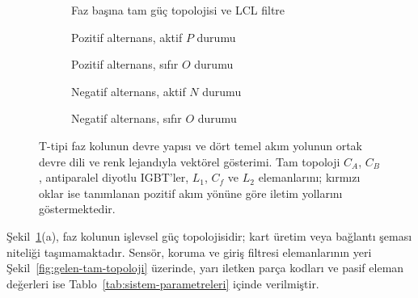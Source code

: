\begin{figure}[htbp]
  \centering
  \begin{subfigure}[t]{0.96\textwidth}
    \centering
    \resizebox{0.98\linewidth}{!}{\ttypefulltopology}
    \caption{Faz başına tam güç topolojisi ve LCL filtre}
  \end{subfigure}

  \vspace{4mm}
  \begin{subfigure}[t]{0.48\textwidth}
    \centering
    \caption{Pozitif alternans, aktif $P$ durumu}
  \end{subfigure}\hfill
  \begin{subfigure}[t]{0.48\textwidth}
    \centering
    \caption{Pozitif alternans, sıfır $O$ durumu}
  \end{subfigure}

  \vspace{4mm}
  \begin{subfigure}[t]{0.48\textwidth}
    \centering
    \caption{Negatif alternans, aktif $N$ durumu}
  \end{subfigure}\hfill
  \begin{subfigure}[t]{0.48\textwidth}
    \centering
    \caption{Negatif alternans, sıfır $O$ durumu}
  \end{subfigure}
  \caption{T-tipi faz kolunun devre yapısı ve dört temel akım yolunun ortak devre dili ve renk lejandıyla vektörel gösterimi. Tam topoloji $C_A$, $C_B$, antiparalel diyotlu IGBT'ler, $L_1$, $C_f$ ve $L_2$ elemanlarını; kırmızı oklar ise tanımlanan pozitif akım yönüne göre iletim yollarını göstermektedir.}
  \label{fig:t-tipi-akim-yollari}
\end{figure}

\begin{samepage}
  Şekil~\ref{fig:t-tipi-akim-yollari}(a), faz kolunun işlevsel güç topolojisidir; kart üretim veya bağlantı şeması niteliği taşımamaktadır. Sensör, koruma ve giriş filtresi elemanlarının yeri Şekil~\ref{fig:gelen-tam-topoloji} üzerinde, yarı iletken parça kodları ve pasif eleman değerleri ise Tablo~\ref{tab:sistem-parametreleri} içinde verilmiştir.
\end{samepage}

